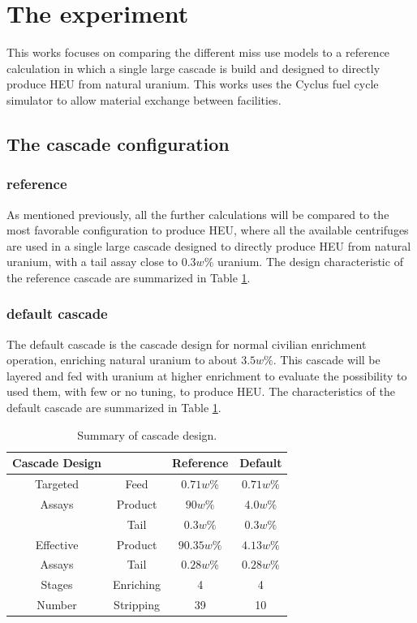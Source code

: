 \section{The experiment}
This works focuses on comparing the different miss use models to a reference
calculation in which a single large cascade is build and designed to directly
produce \gls{HEU} from natural uranium.
This works uses the Cyclus fuel cycle simulator to allow material exchange
between facilities.

\subsection{The cascade configuration}
\subsubsection{reference}
As mentioned previously, all the further calculations will be compared to the
most favorable configuration to produce \gls{HEU}, where all the available
centrifuges are used in a single large cascade designed to directly produce \gls{HEU}
from natural uranium, with a tail assay close to $0.3w\%$ uranium. The design
characteristic of the reference cascade are summarized in Table
\ref{tab:cascade_config}.

\subsubsection{default cascade}
The default cascade is the cascade design for normal civilian enrichment
operation, enriching natural uranium to about $3.5w\%$. This cascade will be
layered and fed with uranium at higher enrichment to evaluate the possibility
to used them, with few or no tuning, to produce \gls{HEU}. The characteristics of
the default cascade are summarized in Table \ref{tab:cascade_config}.

\begin{table}[htb]
\centering
  \caption{Summary of cascade design.}
\begin{tabular}{cccc}
\toprule

Cascade Design &       & Reference  & Default    \\
\midrule
Targeted  & Feed       & $0.71w\%$  & $0.71w\%$  \\
Assays    & Product    & $90w\%$    & $4.0w\%$   \\
          & Tail       & $0.3w\%$   & $0.3w\%$   \\
\midrule
Effective & Product    & $90.35w\%$ & $4.13w\%$  \\
Assays    & Tail       & $0.28w\%$  & $0.28w\%$  \\ 
\midrule
Stages    & Enriching  & 4          & 4          \\
Number    & Stripping  & 39         & 10         \\
\bottomrule
\end{tabular}
  \label{tab:cascade_config}
\end{table}


